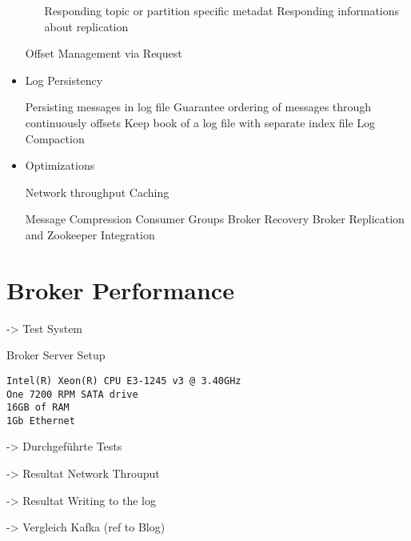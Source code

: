 \begin{itemize}
\begin{itemize}
        \fail Responding topic or partition specific metadat
        \fail Responding informations about replication 
    \end{itemize}
    \fail Offset Management via Request
    \item Log Persistency
    \begin{itemize}
        \tick Persisting messages in log file
        \tick Guarantee ordering of messages through continuously offsets
        \tick Keep book of a log file with separate index file 
        \fail Log Compaction 
    \end{itemize}
    \item Optimizations 
    \begin{itemize}
        \tick Network throughput 
        \tick Caching
    \end{itemize}
    \fail Message Compression 
    \fail Consumer Groups 
    \fail Broker Recovery
    \fail Broker Replication and Zookeeper Integration
   \end{itemize}

\section{Broker Performance}
-> Test System

Broker Server Setup
\begin{verbatim}
Intel(R) Xeon(R) CPU E3-1245 v3 @ 3.40GHz
One 7200 RPM SATA drive
16GB of RAM
1Gb Ethernet 
\end{verbatim}



-> Durchgeführte Tests 

-> Resultat Network Throuput 

-> Resultat Writing to the log 

-> Vergleich Kafka (ref to Blog) 


